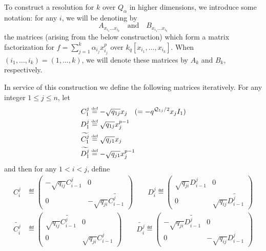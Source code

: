 \documentclass[12pt]{article}
\begin{document}
To construct a resolution for $k$ over $Q_\alpha$ in higher dimensions, we introduce some notation: for any $i$, we will be denoting by 
\[A_{x_{i_1}\dots x_{i_k}}\quad\text{and}\quad B_{x_{i_1}\dots x_{i_k}}\]
the matrices (arising from the below construction) which form a matrix factorization for $f=\sum_{j=1}^k \alpha_{i_j}x_{i_j}^p$ over $k_q[x_{i_1},\dots, x_{i_k}]$. When $(i_1,\dots, i_k)=(1,\dots, k)$, we will denote these matrices by $A_k$ and $B_k$, respectively.

In service of this construction we define the following matrices iteratively. For any integer $1\le j\le n$, let
\begin{align*}
    C_1^j&\stackrel{\text{\tiny def}}{=} -\sqrt{q_{1j}}x_j\quad(=-q^{\mathcal{Q}_{1j}/2}x_jI_1)\\
    D_1^j&\stackrel{\text{\tiny def}}{=} \sqrt{q_{1j}}x_j^{p-1}\\
    \widetilde{C_1^j} &\stackrel{\text{\tiny def}}{=} \sqrt{q_{j1}}x_j\\
    \widetilde{D_1^j}&\stackrel{\text{\tiny def}}{=} -\sqrt{q_{j1}}x_j^{p-1}
\end{align*}
and then for any $1< i< j$, define
\begin{align*}
    C_i^j&\eqdef\begin{pmatrix}-\sqrt{q_{ij}}C_{i-1}^j & 0\\0 & -\sqrt{q_{ji}}\widetilde{C_{i-1}^j}\end{pmatrix}\qquad
    D_i^j\eqdef\begin{pmatrix}\sqrt{q_{ji}}D_{i-1}^j & 0\\0 & \sqrt{q_{ij}}\widetilde{D_{i-1}^j}\end{pmatrix}\\
    \widetilde{C_i^j}&\eqdef\begin{pmatrix}\sqrt{q_{ij}}\widetilde{C_{i-1}^j} & 0\\0 & \sqrt{q_{ji}}C_{i-1}^j\end{pmatrix}\qquad
    \widetilde{D_i^j}\eqdef\begin{pmatrix}-\sqrt{q_{ji}}\widetilde{D_{i-1}^j} & 0\\0 & -\sqrt{q_{ij}}D_{i-1}^j\end{pmatrix}
\end{align*}
\end{document}
